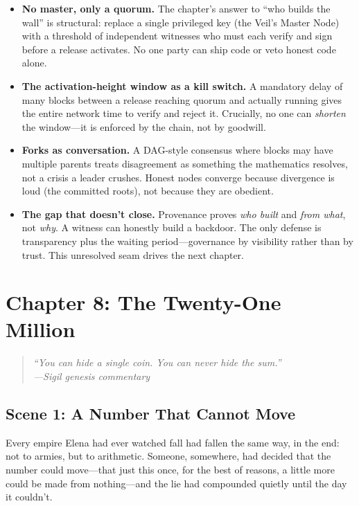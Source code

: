 \documentclass[12pt,letterpaper]{book}
\providecommand{\tightlist}{\setlength{\itemsep}{0pt}\setlength{\parskip}{0pt}}
\begin{document}
\begin{itemize}
\tightlist
\item
  \textbf{No master, only a quorum.} The chapter's answer to ``who builds the
  wall'' is structural: replace a single privileged key (the Veil's Master
  Node) with a threshold of independent witnesses who must each verify and sign
  before a release activates. No one party can ship code or veto honest code
  alone.
\item
  \textbf{The activation-height window as a kill switch.} A mandatory delay of
  many blocks between a release reaching quorum and actually running gives the
  entire network time to verify and reject it. Crucially, no one can
  \emph{shorten} the window---it is enforced by the chain, not by goodwill.
\item
  \textbf{Forks as conversation.} A DAG-style consensus where blocks may have
  multiple parents treats disagreement as something the mathematics resolves,
  not a crisis a leader crushes. Honest nodes converge because divergence is
  loud (the committed roots), not because they are obedient.
\item
  \textbf{The gap that doesn't close.} Provenance proves \emph{who built} and
  \emph{from what}, not \emph{why}. A witness can honestly build a backdoor.
  The only defense is transparency plus the waiting period---governance by
  visibility rather than by trust. This unresolved seam drives the next
  chapter.
\end{itemize}


\hypertarget{chapter-8-the-twenty-one-million}{%
\section{Chapter 8: The Twenty-One
Million}\label{chapter-8-the-twenty-one-million}}

\begin{quote}
\itshape ``You can hide a single coin. You can never hide the sum.''\\
\normalfont\hfill---Sigil genesis commentary
\end{quote}

\hypertarget{scene-1-a-number-that-cannot-move}{%
\subsection{Scene 1: A Number That Cannot
Move}\label{scene-1-a-number-that-cannot-move}}

Every empire Elena had ever watched fall had fallen the same way, in the end:
not to armies, but to arithmetic. Someone, somewhere, had decided that the
number could move---that just this once, for the best of reasons, a little more
could be made from nothing---and the lie had compounded quietly until the day it
couldn't.
\end{document}
